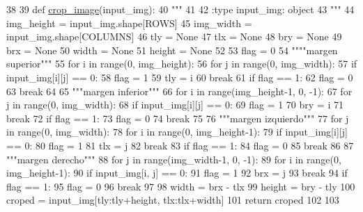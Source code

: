 \begin{DoxyCode}
38 
39 \textcolor{keyword}{def }\hyperlink{namespaceimage__processing_a949b0192d334a4251ed980527886c259}{crop\_image}(input\_img):
40     \textcolor{stringliteral}{"""}
41 \textcolor{stringliteral}{}
42 \textcolor{stringliteral}{    :type input\_img: object}
43 \textcolor{stringliteral}{    """}
44     img\_height = input\_img.shape[ROWS]
45     img\_width = input\_img.shape[COLUMNS]
46     tly = \textcolor{keywordtype}{None}
47     tlx = \textcolor{keywordtype}{None}
48     bry = \textcolor{keywordtype}{None}
49     brx = \textcolor{keywordtype}{None}
50     width = \textcolor{keywordtype}{None}
51     height = \textcolor{keywordtype}{None}
52 
53     flag = 0
54     \textcolor{stringliteral}{""""margen superior"""}
55     \textcolor{keywordflow}{for} i \textcolor{keywordflow}{in} range(0, img\_height):
56         \textcolor{keywordflow}{for} j \textcolor{keywordflow}{in} range(0, img\_width):
57             \textcolor{keywordflow}{if} input\_img[i][j] == 0:
58                 flag = 1
59                 tly = i
60                 \textcolor{keywordflow}{break}
61         \textcolor{keywordflow}{if} flag == 1:
62             flag = 0
63             \textcolor{keywordflow}{break}
64 
65     \textcolor{stringliteral}{"""margen inferior"""}
66     \textcolor{keywordflow}{for} i \textcolor{keywordflow}{in} range(img\_height-1, 0, -1):
67         \textcolor{keywordflow}{for} j \textcolor{keywordflow}{in} range(0, img\_width):
68             \textcolor{keywordflow}{if} input\_img[i][j] == 0:
69                 flag = 1
70                 bry = i
71                 \textcolor{keywordflow}{break}
72         \textcolor{keywordflow}{if} flag == 1:
73             flag = 0
74             \textcolor{keywordflow}{break}
75 
76     \textcolor{stringliteral}{"""margen izquierdo"""}
77     \textcolor{keywordflow}{for} j \textcolor{keywordflow}{in} range(0, img\_width):
78         \textcolor{keywordflow}{for} i \textcolor{keywordflow}{in} range(0, img\_height-1):
79             \textcolor{keywordflow}{if} input\_img[i][j] == 0:
80                 flag = 1
81                 tlx = j
82                 \textcolor{keywordflow}{break}
83         \textcolor{keywordflow}{if} flag == 1:
84             flag = 0
85             \textcolor{keywordflow}{break}
86 
87     \textcolor{stringliteral}{"""margen derecho"""}
88     \textcolor{keywordflow}{for} j \textcolor{keywordflow}{in} range(img\_width-1, 0, -1):
89         \textcolor{keywordflow}{for} i \textcolor{keywordflow}{in} range(0, img\_height-1):
90             \textcolor{keywordflow}{if} input\_img[i, j] == 0:
91                 flag = 1
92                 brx = j
93                 \textcolor{keywordflow}{break}
94         \textcolor{keywordflow}{if} flag == 1:
95             flag = 0
96             \textcolor{keywordflow}{break}
97 
98     width = brx - tlx
99     height = bry - tly
100     croped = input\_img[tly:tly+height, tlx:tlx+width]
101     \textcolor{keywordflow}{return} croped
102 
103 

\end{DoxyCode}
